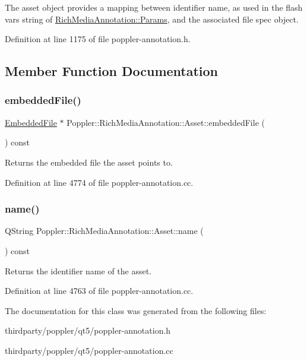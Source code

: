 The asset object provides a mapping between identifier name, as used in the flash vars string of \hyperlink{class_poppler_1_1_rich_media_annotation_1_1_params}{Rich\+Media\+Annotation\+::\+Params}, and the associated file spec object. 

Definition at line 1175 of file poppler-\/annotation.\+h.



\subsection{Member Function Documentation}
\mbox{\label{class_poppler_1_1_rich_media_annotation_1_1_asset_acac8bbfce1f90da91f7655e5eb1799d8}} 
\subsubsection{\texorpdfstring{embedded\+File()}{embeddedFile()}}
{\footnotesize\ttfamily \hyperlink{class_poppler_1_1_embedded_file}{Embedded\+File} $\ast$ Poppler\+::\+Rich\+Media\+Annotation\+::\+Asset\+::embedded\+File (\begin{DoxyParamCaption}{ }\end{DoxyParamCaption}) const}

Returns the embedded file the asset points to. 

Definition at line 4774 of file poppler-\/annotation.\+cc.

\mbox{\label{class_poppler_1_1_rich_media_annotation_1_1_asset_adfda5df2f7cc6ec814d6bd7b4a12d9f3}} 
\subsubsection{\texorpdfstring{name()}{name()}}
{\footnotesize\ttfamily Q\+String Poppler\+::\+Rich\+Media\+Annotation\+::\+Asset\+::name (\begin{DoxyParamCaption}{ }\end{DoxyParamCaption}) const}

Returns the identifier name of the asset. 

Definition at line 4763 of file poppler-\/annotation.\+cc.



The documentation for this class was generated from the following files\+:\begin{DoxyCompactItemize}
\item 
thirdparty/poppler/qt5/poppler-\/annotation.\+h\item 
thirdparty/poppler/qt5/poppler-\/annotation.\+cc\end{DoxyCompactItemize}
